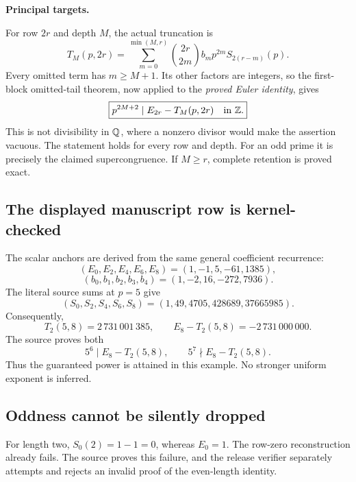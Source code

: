 \textbf{Principal targets.}\par
{}\par
{}\par
{}\par
{}
\par\medskip
{}
For row $2r$ and depth $M$, the actual truncation is
\[
 T_M(p,2r)=\sum_{m=0}^{\min(M,r)}\binom{2r}{2m}b_m p^{2m}S_{2(r-m)}(p).
\]
Every omitted term has $m\ge M+1$. Its other factors are integers, so the first-block omitted-tail theorem, now applied to the \emph{proved Euler identity}, gives
\[
 \boxed{p^{2M+2}\mid E_{2r}-T_M(p,2r)\quad\text{in }\mathbb Z.}
\]
This is not divisibility in $\mathbb Q$, where a nonzero divisor would make the assertion vacuous. The statement holds for every row and depth. For an odd prime it is precisely the claimed supercongruence. If $M\ge r$, complete retention is proved exact.

\subsection*{The displayed manuscript row is kernel-checked}
The scalar anchors are derived from the same general coefficient recurrence:
\[
 (E_0,E_2,E_4,E_6,E_8)=(1,-1,5,-61,1385),
\]
\[
 (b_0,b_1,b_2,b_3,b_4)=(1,-2,16,-272,7936).
\]
The literal source sums at $p=5$ give
\[
 (S_0,S_2,S_4,S_6,S_8)=(1,49,4705,428689,37665985).
\]
Consequently,
\[
 T_2(5,8)=2\,731\,001\,385,\qquad
 E_8-T_2(5,8)=-2\,731\,000\,000.
\]
The source proves both
\[
 5^6\mid E_8-T_2(5,8),\qquad 5^7\nmid E_8-T_2(5,8).
\]
Thus the guaranteed power is attained in this example. No stronger uniform exponent is inferred.

\subsection*{Oddness cannot be silently dropped}
For length two, $S_0(2)=1-1=0$, whereas $E_0=1$. The row-zero reconstruction already fails. The source proves this failure, and the release verifier separately attempts and rejects an invalid proof of the even-length identity.


